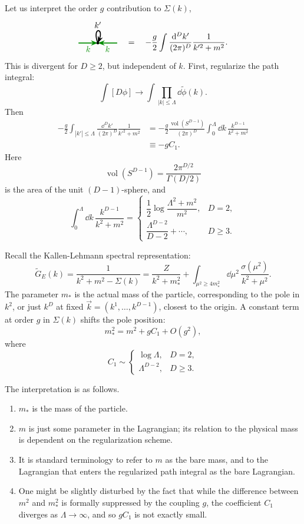 Let us interpret the order \(g\) contribution to \(\Sigma(k)\),
\[
\begin{tikzpicture}[baseline=-0.45ex, scale=0.75, >=Stealth]
  \draw[green!55!black, very thick, ->] (-1.1,0)--(0,0) node[midway, below] {$k$};
  \draw[green!55!black, very thick, ->] (1.1,0)--(0,0) node[midway, below] {$k$};
  \fill (0,0) circle (2.2pt);
  \draw[very thick, ->] (0,0) .. controls (-0.35,0.9) and (0.35,0.9) .. (0,0)
    node[midway, above] {$k'$};
\end{tikzpicture}
\quad=\quad
-\frac{g}{2}
\int\frac{\dd^D k'}{(2\pi)^D}\frac{1}{k'^2+m^2}.
\]
This is divergent for \(D\ge 2\), but independent of \(k\).
First, regularize the path integral:
\[
  \int[D\phi]
  \longrightarrow
  \int \prod_{|k|\le\Lambda}\dd\widetilde\phi(k).
\]
Then
\[
\begin{aligned}
  -\frac{g}{2}
  \int_{|k'|\le\Lambda}
  \frac{\dd^D k'}{(2\pi)^D}\frac{1}{k'^2+m^2}
  &=
  -\frac{g}{2}
  \frac{\operatorname{vol}(S^{D-1})}{(2\pi)^D}
  \int_0^\Lambda \dd k\,
  \frac{k^{D-1}}{k^2+m^2}  \\
  &\equiv
  -g C_1 .
\end{aligned}
\]
Here
\[
  \operatorname{vol}(S^{D-1})
  =
  \frac{2\pi^{D/2}}{\Gamma(D/2)}
\]
is the area of the unit \((D-1)\)-sphere, and
\[
  \int_0^\Lambda \dd k\,\frac{k^{D-1}}{k^2+m^2}
  =
  \begin{cases}
    \dfrac12\log\dfrac{\Lambda^2+m^2}{m^2}, & D=2,\\[3mm]
    \dfrac{\Lambda^{D-2}}{D-2}+\cdots, & D\ge 3.
  \end{cases}
\]

Recall the Kallen-Lehmann spectral representation:
\[
  \widetilde G_E(k)
  =
  \frac{1}{k^2+m^2-\Sigma(k)}
  =
  \frac{Z}{k^2+m_*^2}
  +
  \int_{\mu^2\ge 4m_*^2}\dd\mu^2\,
  \frac{\sigma(\mu^2)}{k^2+\mu^2}.
\]
The parameter \(m_*\) is the actual mass of the particle, corresponding to
the pole in \(k^2\), or just \(k^D\) at fixed
\(\vec k=(k^1,\ldots,k^{D-1})\), closest to the origin. A constant term at
order \(g\) in \(\Sigma(k)\) shifts the pole position:
\[
  m_*^2=m^2+gC_1+O(g^2),
\]
where
\[
  C_1\sim
  \begin{cases}
    \log\Lambda, & D=2,\\
    \Lambda^{D-2}, & D\ge 3.
  \end{cases}
\]

The interpretation is as follows.
\begin{enumerate}[label=\arabic*.]
  \item \(m_*\) is the mass of the particle.
  \item \(m\) is just some parameter in the Lagrangian; its relation to the
  physical mass is dependent on the regularization scheme.
  \item It is standard terminology to refer to \(m\) as the bare mass, and to
  the Lagrangian that enters the regularized path integral as the bare
  Lagrangian.
  \item One might be slightly disturbed by the fact that while the difference
  between \(m^2\) and \(m_*^2\) is formally suppressed by the coupling \(g\),
  the coefficient \(C_1\) diverges as \(\Lambda\to\infty\), and so \(gC_1\)
  is not exactly small.
\end{enumerate}

